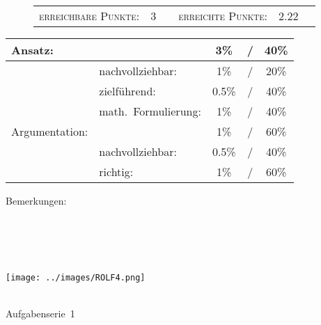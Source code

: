 \documentclass{article}
\begin{document}
\vspace{-0.5cm}
\begin{figure}[h!]
\begin{tabular}{crcrcr}
\textsc{erreichbare Punkte:} &3& & \textsc{erreichte Punkte:} &2.22
\end{tabular}
\end{figure}
\vspace{-0.1cm}
\begin{minipage}[t]{0.6\textwidth}
\flushleft
\begin{tabular}{l|lccc}
Ansatz:& &3\%&/&40\%\\\hline
&nachvollziehbar:&1\%&/&20\%\\
&zielf{\"u}hrend:&0.5\%&/&40\%\\
&math.~Formulierung:& 1\%&/&40\%\\\hline\hline
Argumentation:& &1\%&/&60\%\\\hline
&nachvollziehbar:&0.5\%&/&40\%\\
&richtig:&1\%&/&60\%\\\hline
\end{tabular}
\end{minipage}
\hfill
\begin{minipage}[t]{0.4\textwidth}
	\vspace{-1.75cm}
	Bemerkungen:\\\vspace*{0.2cm}
	\underline{\hspace{0.75\textwidth}}\\\vspace*{0.2cm}
	\underline{\hspace{0.75\textwidth}}
	\\\vspace*{0.2cm}
	\underline{\hspace{0.75\textwidth}}
	\\\vspace*{0.2cm}
	\underline{\hspace{0.75\textwidth}}
	\\\vspace*{0.2cm}
	\underline{\hspace{0.75\textwidth}}
\end{minipage}
	\vspace{0.5cm}\clearpage\vspace*{-2cm}
\parbox{4cm}{\texttt{[image: ../images/ROLF4.png]}}
\parbox{10.6cm}{ \\ Aufgabenserie~1  \\ \vspace*{-.5cm} }
\end{document}
